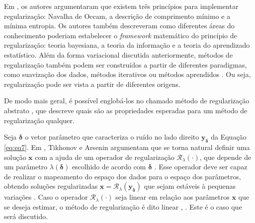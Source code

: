 Em \cite{Chen2002}, os autores argumentaram que existem três princípios para implementar regularização: Navalha de Occam, a descrição de comprimento mínimo e a mínima entropia. Os autores também descreveram como diferentes áreas do conhecimento poderiam estabelecer o \textit{framework} matemático do princípio de regularização: teoria bayesiana, a teoria da informação e a teoria do aprendizado estatístico. Além da forma variacional discutida anteriormente, métodos de regularização também podem ser construídos a partir de diferentes paradigmas, como suavização dos dados, métodos iterativos \cite{Benning2018} ou métodos aprendidos \cite[págs. 3-4]{Burger2021}. Ou seja, regularização pode ser vista a partir de diferentes origens.

De modo mais geral, é possível englobá-los no chamado método de regularização abstrato \cite[Seção 4.1]{Benning2018}, que descreve quais são as propriedades esperadas para um método de regularização qualquer. 

Seja $\bm{\delta}$ o vetor parâmetro que caracteriza o ruído no lado direito $\mathbf{y}_{\bm{\delta}}$ da Equação \eqref{eq:eq7}. Em \cite[pág. 46]{tikhonov1977solutions}, Tikhonov e Arsenin argumentam que se torna natural definir uma solução $\mathbf{x}$ com a ajuda de um operador de regularização $ \mathcal{R}_{\lambda}(\cdot)$, que depende de um parâmetro $\lambda(\bm{\delta})$ escolhido de acordo com $\bm{\delta}$ . Esse operador deve ser capaz de realizar o mapeamento do espaço dos dados para o espaço dos parâmetros, obtendo soluções regularizadas $\mathbf{x} = \mathcal{R}_{\lambda}(\mathbf{y}_{\bm{\delta}})$ que sejam estáveis à pequenas variações \cite[pág. 175]{alvarez2017digital}. Caso o operador $ \mathcal{R}_{\lambda}(\cdot)$ seja linear em relação aos parâmetros $\mathbf{x}$ que se deseja estimar, o método de regularização é dito linear \cite[Definição 4.2]{Benning2018}, \cite[pág. 51]{engl1996regularization}. Este é o caso que será discutido. 

